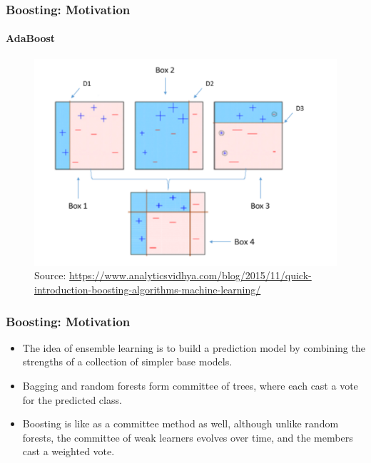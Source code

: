\documentclass[
  shownotes,
  xcolor={svgnames},
  hyperref={colorlinks,citecolor=DarkBlue,linkcolor=DarkRed,urlcolor=DarkBlue}
  , aspectratio=169]{beamer}
\begin{document}
\begin{frame}[fragile]
\frametitle{Boosting: Motivation}
\framesubtitle{AdaBoost}

\begin{figure}[H] \centering
            \captionsetup{justification=centering}
              \includegraphics[scale=0.5]{figures/adaboost.png}
              \\
              \tiny
              Source: \url{https://www.analyticsvidhya.com/blog/2015/11/quick-introduction-boosting-algorithms-machine-learning/}
 \end{figure}

\end{frame}
\begin{frame}[fragile]
\frametitle{Boosting: Motivation}

\begin{itemize}


\item The idea of ensemble learning is to build a prediction model by combining the strengths of a collection of simpler base models.
\medskip
\item  Bagging and random forests form committee of trees, where each cast a vote for the predicted class. 
\medskip
\item Boosting is like as a committee method as well, although unlike random forests, the committee of weak learners evolves over time, and the members cast a weighted vote.


\end{itemize}

\end{frame}
\end{document}
